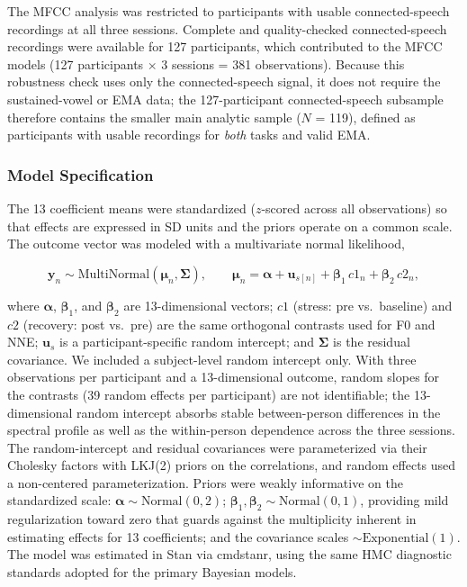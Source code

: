 \documentclass[
  english,
  man,floatsintext]{apa6}
\begin{document}
The MFCC analysis was restricted to participants with usable connected-speech recordings at all three sessions. Complete and quality-checked connected-speech recordings were available for 127 participants, which contributed to the MFCC models (127 participants \(\times\) 3 sessions = 381 observations). Because this robustness check uses only the connected-speech signal, it does not require the sustained-vowel or EMA data; the 127-participant connected-speech subsample therefore contains the smaller main analytic sample (\(N\) = 119), defined as participants with usable recordings for \emph{both} tasks and valid EMA.

\subsubsection{Model Specification}\label{model-specification-2}

The 13 coefficient means were standardized (\(z\)-scored across all observations) so that effects are expressed in SD units and the priors operate on a common scale. The outcome vector was modeled with a multivariate normal likelihood,

\[\mathbf{y}_n \sim \text{MultiNormal}(\boldsymbol{\mu}_n, \boldsymbol{\Sigma}), \qquad \boldsymbol{\mu}_n = \boldsymbol{\alpha} + \mathbf{u}_{s[n]} + \boldsymbol{\beta}_1\, c1_n + \boldsymbol{\beta}_2\, c2_n,\]

where \(\boldsymbol{\alpha}\), \(\boldsymbol{\beta}_1\), and \(\boldsymbol{\beta}_2\) are 13-dimensional vectors; \(c1\) (stress: pre vs.~baseline) and \(c2\) (recovery: post vs.~pre) are the same orthogonal contrasts used for F0 and NNE; \(\mathbf{u}_s\) is a participant-specific random intercept; and \(\boldsymbol{\Sigma}\) is the residual covariance. We included a subject-level random intercept only. With three observations per participant and a 13-dimensional outcome, random slopes for the contrasts (39 random effects per participant) are not identifiable; the 13-dimensional random intercept absorbs stable between-person differences in the spectral profile as well as the within-person dependence across the three sessions. The random-intercept and residual covariances were parameterized via their Cholesky factors with LKJ(2) priors on the correlations, and random effects used a non-centered parameterization. Priors were weakly informative on the standardized scale: \(\boldsymbol{\alpha} \sim \text{Normal}(0, 2)\); \(\boldsymbol{\beta}_1, \boldsymbol{\beta}_2 \sim \text{Normal}(0, 1)\), providing mild regularization toward zero that guards against the multiplicity inherent in estimating effects for 13 coefficients; and the covariance scales \(\sim \text{Exponential}(1)\). The model was estimated in Stan via cmdstanr, using the same HMC diagnostic standards adopted for the primary Bayesian models.
\end{document}
